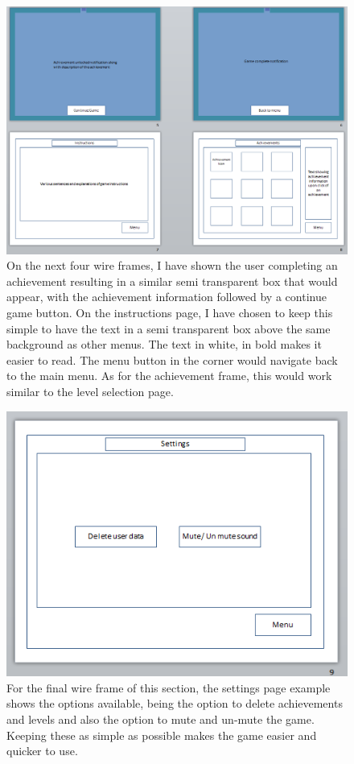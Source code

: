 \documentclass[a4paper]{article}
\begin{document}
   \begin{figure}[!ht]
   \centering
   \includegraphics[scale=0.6]{wire2.png}
  \caption{On the next four wire frames, I have shown the user completing an
achievement resulting in a similar semi transparent box that would appear, with
the achievement information followed by a continue game button. On the
instructions page, I have chosen to keep this simple to have the text in a semi
transparent box above the same background as other menus. The text in white, in
bold makes it easier to read. The menu button in the corner would navigate back
to the main menu. As for the achievement frame, this would work similar to the
level selection page.}
   \end{figure}
  \begin{figure}[!ht]
   \centering
   \includegraphics[scale=0.7]{wire3.png}
  \caption{For the final wire frame of this section, the settings page example
shows the options available, being the option to delete achievements and levels
and also the option to mute and un-mute the game. Keeping these as simple as
possible makes the game easier and quicker to use.}
   \end{figure}
\end{document}
